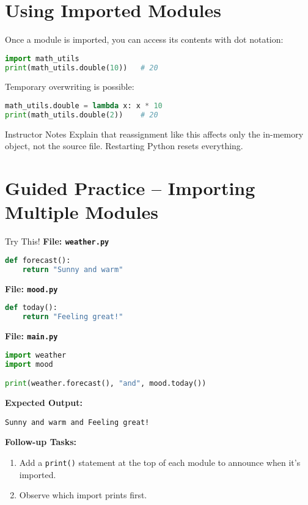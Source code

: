 \documentclass[12pt]{article}
\begin{document}
\section{Using Imported Modules}

Once a module is imported, you can access its contents with dot notation:
\begin{lstlisting}[language=Python]
import math_utils
print(math_utils.double(10))   # 20
\end{lstlisting}

Temporary overwriting is possible:
\begin{lstlisting}[language=Python]
math_utils.double = lambda x: x * 10
print(math_utils.double(2))    # 20
\end{lstlisting}

\begin{teacherbox}{Instructor Notes}
Explain that reassignment like this affects only the in-memory object, not the source file.  
Restarting Python resets everything.
\end{teacherbox}

\section{Guided Practice – Importing Multiple Modules}

\begin{activitybox}{Try This!}
\textbf{File: \texttt{weather.py}}
\begin{lstlisting}[language=Python]
def forecast():
    return "Sunny and warm"
\end{lstlisting}

\textbf{File: \texttt{mood.py}}
\begin{lstlisting}[language=Python]
def today():
    return "Feeling great!"
\end{lstlisting}

\textbf{File: \texttt{main.py}}
\begin{lstlisting}[language=Python]
import weather
import mood

print(weather.forecast(), "and", mood.today())
\end{lstlisting}

\textbf{Expected Output:}
\begin{lstlisting}
Sunny and warm and Feeling great!
\end{lstlisting}

\textbf{Follow-up Tasks:}
\begin{enumerate}
  \item Add a \texttt{print()} statement at the top of each module to announce when it’s imported.
  \item Observe which import prints first.
\end{enumerate}
\end{activitybox}
\end{document}
